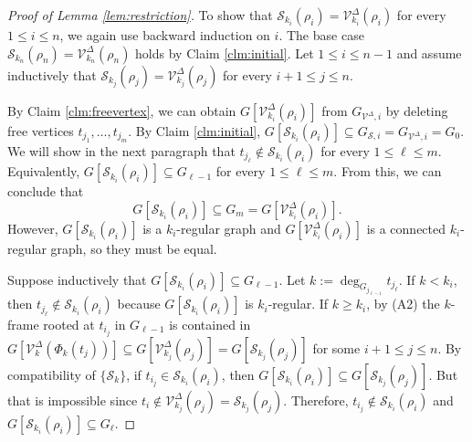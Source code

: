 \documentclass[11pt,twoside]{article}
\theoremstyle{definition}
\newcommand{\cS}{\mathcal{S}}
\newcommand{\cV}{\mathcal{V}}
\begin{document}
\begin{proof} [Proof of Lemma \ref{lem:restriction}]
To show that $\cS_{k_i}(\rho_i) = \cV^\Delta_{k_i}(\rho_i)$ for every $1 \le i \le n$, we again use backward induction on $i$. The base case $\cS_{k_n}(\rho_n) = \cV^\Delta_{k_n}(\rho_n)$ holds by Claim \ref{clm:initial}. Let $1 \le i \le n-1$ and assume inductively that $\cS_{k_j}(\rho_j) = \cV^\Delta_{k_j}(\rho_j)$ for every $i + 1 \le j \le n$. 

By Claim \ref{clm:freevertex}, we can obtain $G[\cV^\Delta_{k_i}(\rho_i)]$ from $G_{\cV^\Delta, i}$ by deleting free vertices $t_{j_1}, \dots, t_{j_m}$. By Claim \ref{clm:initial}, $G[\cS_{k_i}(\rho_i)] \subseteq G_{\cS, i} = G_{\cV^\Delta, i} = G_0$. We will show in the next paragraph that $t_{j_\ell} \notin \cS_{k_i}(\rho_i)$ for every $1 \le \ell \le m$. Equivalently, $G[\cS_{k_i}(\rho_i)] \subseteq G_{\ell - 1}$ for every $1 \le \ell \le m$. From this, we can conclude that 
\[
G[\cS_{k_i}(\rho_i)] \subseteq G_m = G[\cV^\Delta_{k_i}(\rho_i)].
\]
However, $G[\cS_{k_i}(\rho_i)]$ is a $k_i$-regular graph and $G[\cV^\Delta_{k_i}(\rho_i)]$ is a connected $k_i$-regular graph, so they must be equal. 

Suppose inductively that $G[\cS_{k_i}(\rho_i)] \subseteq G_{\ell - 1}$. Let $k := \deg_{G_{j_{\ell - 1}}} t_{j_\ell}$. If $k < k_i$, then $t_{j_\ell} \notin \cS_{k_i}(\rho_i)$ because $G[\cS_{k_i}(\rho_i)]$ is $k_i$-regular. If $k \ge k_i$, by (A2) the $k$-frame rooted at $t_{i_j}$ in $G_{\ell-1}$ is contained in $G[\cV^\Delta_k(\Phi_k(t_j))] \subseteq G[\cV^\Delta_{k_j}(\rho_j)] = G[\cS_{k_j}(\rho_j)]$ for some $i+1 \le j \le n$. By compatibility of $\{\cS_k\}$, if $t_{i_j} \in \cS_{k_i}(\rho_i)$, then $G[\cS_{k_i}(\rho_i)] \subseteq G[\cS_{k_j}(\rho_j)]$. But that is impossible since $t_i \notin \cV^\Delta_{k_j}(\rho_j) = \cS_{k_j}(\rho_j)$. Therefore, $t_{i_j} \notin \cS_{k_i}(\rho_i)$ and $G[\cS_{k_i}(\rho_i)] \subseteq G_\ell$. 
\end{proof}
\end{document}
